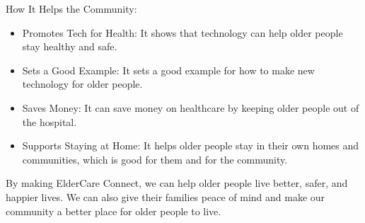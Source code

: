 \documentclass{article}
\begin{document}
How It Helps the Community:

\begin{itemize}
    \item Promotes Tech for Health: It shows that technology can help older people stay healthy and safe.
    \item Sets a Good Example: It sets a good example for how to make new technology for older people.
    \item Saves Money: It can save money on healthcare by keeping older people out of the hospital.
    \item Supports Staying at Home: It helps older people stay in their own homes and communities, which is good for them and for the community.
\end{itemize}

By making ElderCare Connect, we can help older people live better, safer, and happier lives. We can also give their families peace of mind and make our community a better place for older people to live.
\end{document}
